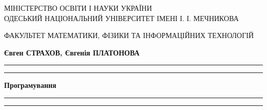 \begin{titlepage} %
	\newcommand{\HRule}{\rule{\linewidth}{0.5mm}} %
	
	\centering %
	
	\Large МІНІСТЕРСТВО ОСВІТИ І НАУКИ УКРАЇНИ\\  %
	\medskip
	\large ОДЕСЬКИЙ НАЦІОНАЛЬНИЙ УНІВЕРСИТЕТ ІМЕНІ І. І. МЕЧНИКОВА%
	
	\large ФАКУЛЬТЕТ МАТЕМАТИКИ, ФІЗИКИ ТА ІНФОРМАЦІЙНИХ ТЕХНОЛОГІЙ %
	
	
	\vspace*{5\baselineskip} %
	
	
	{\Large 	\textbf{Євген СТРАХОВ, Євгенія ПЛАТОНОВА}\\} %
	
	\vspace{1\baselineskip} %
	\rule{\textwidth}{1.6pt}\vspace*{-\baselineskip}\vspace*{2pt} %
	\rule{\textwidth}{0.4pt} %
	
	\vspace{1\baselineskip} %
	
	{\LARGE \textbf{Програмування}} %
	
	\vspace{0.5\baselineskip} %
	
	\rule{\textwidth}{0.4pt}\vspace*{-\baselineskip}\vspace{3.2pt} %
	\rule{\textwidth}{1.6pt} %
	
	\vspace{1\baselineskip} %
	

\end{titlepage}
